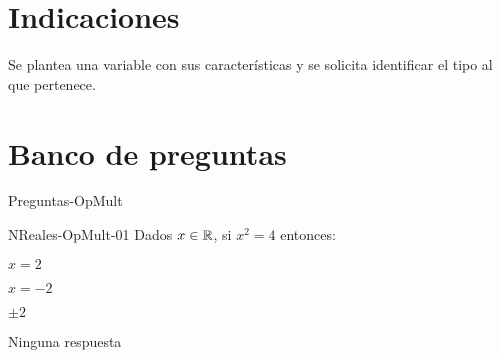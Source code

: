 \documentclass[a4,11pt]{aleph-notas-beta}
\begin{document}
\encabezado

\vspace*{-8mm}
\section{Indicaciones}

Se plantea una variable con sus características y se solicita identificar el tipo al que pertenece.

\section{Banco de preguntas}

\begin{quiz}{Preguntas-OpMult}

\begin{multi}[]%
    {NReales-OpMult-01}
    Dados $x\in \mathbb{R}$, si $x^2=4$ entonces:
    \item $x=2$
    \item $x=-2$
    \item* $\pm 2$
    \item Ninguna respuesta
\end{multi}



\end{quiz}
\end{document}
